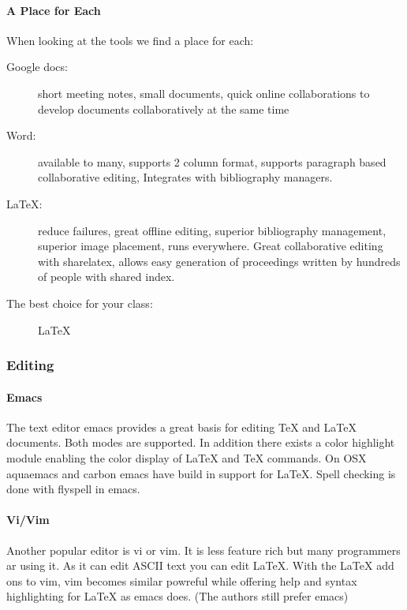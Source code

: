 \paragraph{A Place for Each}
\label{\detokenize{lesson/doc/latex:a-place-for-each}}
When looking at the tools we find a place for each:
\begin{description}
\item[{Google docs:}] \leavevmode
short meeting notes, small documents, quick online collaborations
to develop documents collaboratively at the same time

\item[{Word:}] \leavevmode
available to many, supports 2 column format, supports paragraph
based collaborative editing, Integrates with bibliography managers.

\item[{LaTeX:}] \leavevmode
reduce failures, great offline editing, superior bibliography
management, superior image placement, runs everywhere. Great
collaborative editing with sharelatex, allows easy generation of
proceedings written by hundreds of people with shared index.

\item[{The best choice for your class:}] \leavevmode
LaTeX

\end{description}


\subsubsection{Editing}
\label{\detokenize{lesson/doc/latex:editing}}

\paragraph{Emacs}
\label{\detokenize{lesson/doc/latex:emacs}}
The text editor emacs provides a great basis for editing TeX and LaTeX
documents. Both modes are supported. In addition there exists a color
highlight module enabling the color display of LaTeX and TeX commands.
On OSX aquaemacs and carbon emacs have build in support for LaTeX. Spell
checking is done with flyspell in emacs.


\paragraph{Vi/Vim}
\label{\detokenize{lesson/doc/latex:vi-vim}}
Another popular editor is vi or vim. It is less feature rich but many
programmers ar using it. As it can edit ASCII text you can edit LaTeX.
With the LaTeX add ons to vim, vim becomes similar powreful while
offering help and syntax highlighting for LaTeX as emacs does. (The
authors still prefer emacs)


